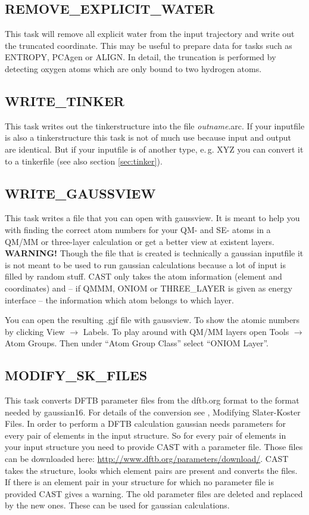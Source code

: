 \documentclass[10pt,a4paper]{article} %
\begin{document}
	\subsection{REMOVE\_EXPLICIT\_WATER}	
	This task will remove all explicit water from the input trajectory and write out the truncated coordinate. This may be useful to prepare data for tasks such as ENTROPY, PCAgen or ALIGN. In detail, the truncation is performed by detecting oxygen atoms which are only bound to two hydrogen atoms.\\
	
	\subsection{WRITE\_TINKER}
	This task writes out the tinkerstructure into the file \textit{outname}.arc. If your inputfile is also a tinkerstructure this task is not of much use because input and output are identical. But if your inputfile is of another type, e.\,g. XYZ you can convert it to a tinkerfile (see also section \ref{sec:tinker}).
	
	\subsection{WRITE\_GAUSSVIEW}
	This task writes a file that you can open with gaussview. It is meant to help you with finding the correct atom numbers for your QM- and SE- atoms in a QM/MM or three-layer calculation or get a better view at existent layers.
	\textbf{WARNING!} Though the file that is created is technically a gaussian inputfile it is not meant to be used to run gaussian calculations because a lot of input is filled by random stuff. CAST only takes the atom information (element and coordinates) and -- if QMMM, ONIOM or THREE\_LAYER is given as energy interface -- the information which atom belongs to which layer.
	
	You can open the resulting .gjf file with gaussview. To show the atomic numbers by clicking View $\rightarrow$ Labels. To play around with QM/MM layers open Tools $\rightarrow$ Atom Groups. Then under "`Atom Group Class"' select "`ONIOM Layer"'.
	
	\subsection{MODIFY\_SK\_FILES}
	This task converts DFTB parameter files from the dftb.org format to the format needed by gaussian16. For details of the conversion see \cite{noauthor_dftbgaussian_nodate}, Modifying Slater-Koster Files. In order to perform a DFTB calculation gaussian needs parameters for every pair of elements in the input structure. So for every pair of elements in your input structure you need to provide CAST with a parameter file. Those files can be downloaded here: \url{http://www.dftb.org/parameters/download/}. CAST takes the structure, looks which element pairs are present and converts the files. If there is an element pair in your structure for which no parameter file is provided CAST gives a warning. The old parameter files are deleted and replaced by the new ones. These can be used for gaussian calculations.
	
\end{document}
